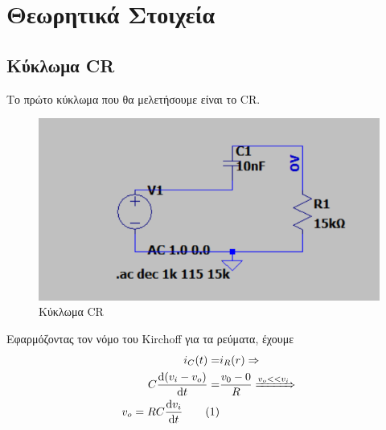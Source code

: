 \documentclass[a4paper]{article}
\newcommand\numberthis{\addtocounter{equation}{1}\tag{\theequation}}
\begin{document}
\section*{Θεωρητικά Στοιχεία} 
\subsection*{Κύκλωμα CR}

	Το πρώτο κύκλωμα που θα μελετήσουμε είναι το CR. 
		\begin{figure}[h!]
			\centering 
			\includegraphics[scale=0.6]{./figures/CR.png}
			\caption{Κύκλωμα CR}
			\label{fig1}	
		\end{figure}
		
	Εφαρμόζοντας τον νόμο του Kirchoff για τα ρεύματα, έχουμε	
		\begin{align*}
			i_C(t) =& i_R(r)  \Rightarrow\\ 
			C\odv{(v_i-v_o)}{t}=& \frac{v_0-0}{R}\xRightarrow{v_o<<v_i}\\
			v_o = RC\odv{v_i}{t} \numberthis
		\end{align*}
	
\end{document}
